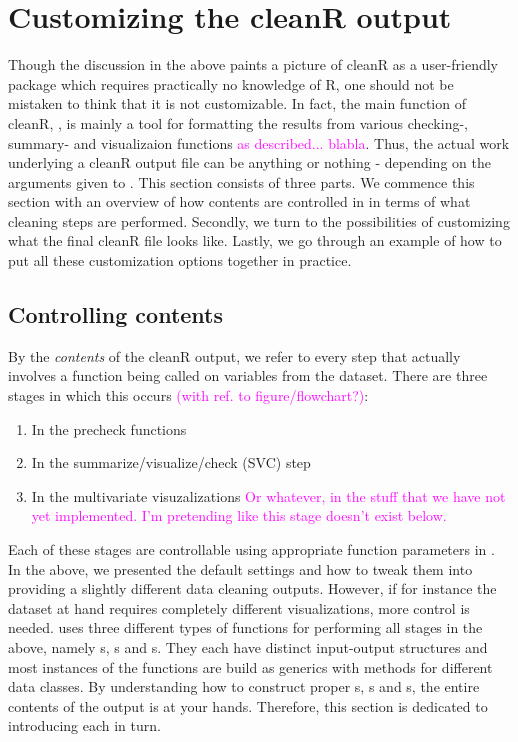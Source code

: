 \documentclass[article]{jss}
\newcommand{\hl}[1]{\textcolor{magenta}{#1}}
\begin{document}
\section{Customizing the cleanR output}
Though the discussion in the above paints a picture of cleanR as a user-friendly package which requires practically no knowledge of R, one should not be mistaken to think that it is not customizable. In fact, the main function of cleanR, , is mainly a tool for formatting the results from various checking-, summary- and visualizaion functions \hl{as described... blabla}. Thus, the actual work underlying a cleanR output file can be anything or nothing - depending on the arguments given to . This section consists of three parts. We commence this section with an overview of how contents are controlled in  in terms of what cleaning steps are performed. Secondly, we turn to the possibilities of customizing what the final cleanR file looks like. Lastly, we go through an example of how to put all these customization options together in practice.

\subsection{Controlling contents}
By the \textit{contents} of the cleanR output, we refer to every step that actually involves a function being called on variables from the dataset. There are three stages in which this occurs \hl{(with ref. to figure/flowchart?)}:
\begin{enumerate}
\item In the precheck functions
\item In the summarize/visualize/check (SVC) step
\item In the multivariate visuzalizations \hl{Or whatever, in the stuff that we have not yet implemented. I'm pretending like this stage doesn't exist below.}
\end{enumerate}
Each of these stages are controllable using appropriate function parameters in . In the above, we presented the default  settings and how to tweak them into providing a slightly different data cleaning outputs. However, if for instance the dataset at hand requires completely different visualizations, more control is needed.  uses three different types of functions for performing all stages in the above, namely s, s and s. They each have distinct input-output structures and most instances of the functions are build as  generics with methods for different data classes. By understanding how to construct proper s, s and s, the entire contents of the  output is at your hands. Therefore, this section is dedicated to introducing each in turn.\\
\end{document}

